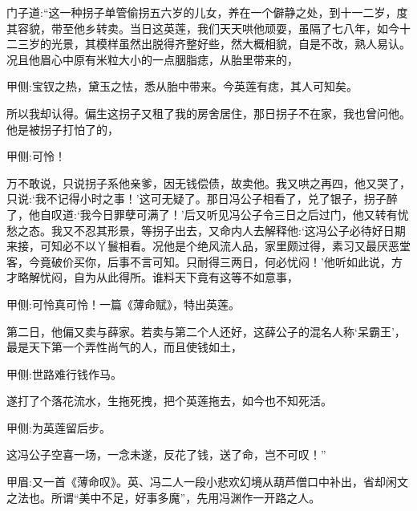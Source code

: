 \begin{parag}
    门子道:“这一种拐子单管偷拐五六岁的儿女，养在一个僻静之处，到十一二岁，度其容貌，带至他乡转卖。当日这英莲，我们天天哄他顽耍，虽隔了七八年，如今十二三岁的光景，其模样虽然出脱得齐整好些，然大概相貌，自是不改，熟人易认。况且他眉心中原有米粒大小的一点胭脂痣，从胎里带来的，\begin{note}甲侧:宝钗之热，黛玉之怯，悉从胎中带来。今英莲有痣，其人可知矣。\end{note}所以我却认得。偏生这拐子又租了我的房舍居住，那日拐子不在家，我也曾问他。他是被拐子打怕了的，\begin{note}甲侧:可怜！\end{note}万不敢说，只说拐子系他亲爹，因无钱偿债，故卖他。我又哄之再四，他又哭了，只说:‘我不记得小时之事！’这可无疑了。那日冯公子相看了，兑了银子，拐子醉了，他自叹道:‘我今日罪孽可满了！’后又听见冯公子令三日之后过门，他又转有忧愁之态。我又不忍其形景，等拐子出去，又命内人去解释他:‘这冯公子必待好日期来接，可知必不以丫鬟相看。况他是个绝风流人品，家里颇过得，素习又最厌恶堂客，今竟破价买你，后事不言可知。只耐得三两日，何必忧闷！’他听如此说，方才略解忧闷，自为从此得所。谁料天下竟有这等不如意事，\begin{note}甲侧:可怜真可怜！一篇《薄命赋》，特出英莲。\end{note}第二日，他偏又卖与薛家。若卖与第二个人还好，这薛公子的混名人称‘呆霸王’，最是天下第一个弄性尚气的人，而且使钱如土，\begin{note}甲侧:世路难行钱作马。\end{note}遂打了个落花流水，生拖死拽，把个英莲拖去，如今也不知死活。\begin{note}甲侧:为英莲留后步。\end{note}这冯公子空喜一场，一念未遂，反花了钱，送了命，岂不可叹！”\begin{note}甲眉:又一首《薄命叹》。英、冯二人一段小悲欢幻境从葫芦僧口中补出，省却闲文之法也。所谓“美中不足，好事多魔”，先用冯渊作一开路之人。\end{note}
\end{parag}


